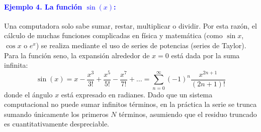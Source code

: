 \documentclass[12pt]{article}
\begin{document}
\paragraph{\textcolor{blue}{Ejemplo 4. La función $\sin(x)$:}}
Una computadora solo sabe sumar, restar, multiplicar o dividir.
Por esta razón, el cálculo de muchas funciones complicadas en física y 
matemática (como $\sin x$, $\cos x$ o $e^x$) se realiza mediante el uso 
de series de potencias (series de Taylor).
Para la función seno, la expansión alrededor de $x = 0$ está dada por 
la suma infinita:
\[
    \sin(x) = x - \frac{x^3}{3!} + \frac{x^5}{5!} - \frac{x^7}{7!} + \dots 
    = \sum_{n=0}^{\infty} (-1)^n \frac{x^{2n+1}}{(2n+1)!}
\]
donde el ángulo $x$ está expresado en radianes.
Dado que un sistema computacional no puede sumar infinitos términos, 
en la práctica la serie se trunca sumando únicamente los primeros $N$ 
términos, asumiendo que el residuo truncado es cuantitativamente despreciable.
\end{document}
